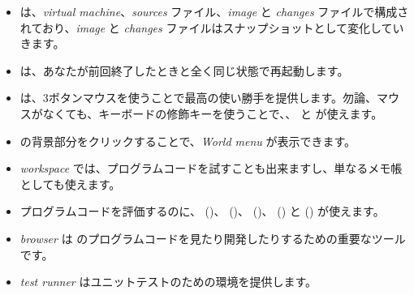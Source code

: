 \documentclass[a4paper,10pt,twoside]{book}
\begin{document}
\begin{itemize}
  \item \pharo は、\emph{virtual machine}、\emph{sources} ファイル、\emph{image} と \emph{changes} ファイルで構成されており、\emph{image} と \emph{changes} ファイルはスナップショットとして変化していきます。
  \item \pharo は、あなたが前回終了したときと全く同じ状態で再起動します。
  \item \pharo は、3ボタンマウスを使うことで最高の使い勝手を提供します。勿論、マウスがなくても、キーボードの修飾キーを使うことで、\click、 \actclick と \metaclick が使えます。
  \item \pharo の背景部分をクリックすることで、\emph{World menu} が表示できます。
  \item \emph{workspace} では、プログラムコードを試すことも出来ますし、単なるメモ帳としても使えます。
  \item プログラムコードを評価するのに、 ()、  ()、  ()、  () と  () が使えます。
  \item \emph{browser} は \pharo のプログラムコードを見たり開発したりするための重要なツールです。
  \item \emph{test runner} はユニットテストのための環境を提供します。
\end{itemize}

\ifx\wholebook\relax\else 
   
   
\end{document}
